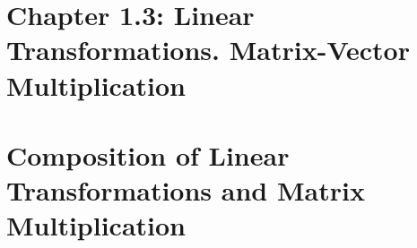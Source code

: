\documentclass[a4paper]{article}
\begin{document}
\part*{Chapter 1.3: Linear Transformations. Matrix-Vector Multiplication}

\pagebreak

\pagebreak

\pagebreak
\part*{Composition of Linear Transformations and Matrix Multiplication}


\end{document}
